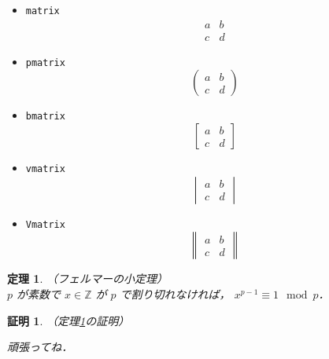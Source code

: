 \documentclass[uplatex]{jsarticle}
\newtheorem{thm}{定理}
\newtheorem{prf}{証明}
\begin{document}
\begin{itemize}
    \item \verb|matrix|
    \begin{equation}
    \begin{matrix}
        a & b \\
        c & d 
    \end{matrix}
    \end{equation}
    \item \verb|pmatrix|
    \begin{equation}
    \begin{pmatrix}
        a & b \\
        c & d 
    \end{pmatrix}
    \end{equation}
    \item \verb|bmatrix|
    \begin{equation}
    \begin{bmatrix}
        a & b \\
        c & d 
    \end{bmatrix}
    \end{equation}
    \item \verb|vmatrix|
    \begin{equation}
    \begin{vmatrix}
        a & b \\
        c & d 
    \end{vmatrix}
    \end{equation}
    \item \verb|Vmatrix|
    \begin{equation}
    \begin{Vmatrix}
        a & b \\
        c & d 
    \end{Vmatrix}
    \end{equation}
\end{itemize}

\begin{screen}
    \begin{thm}（フェルマーの小定理）\\
        \label{fermat}
        $p$ が素数で $x \in \mathbb{Z}$ が $p$ で割り切れなければ，
        $x^{p-1} \equiv 1 \mod{p}$．
    \end{thm}
\end{screen}

\begin{prf}
    （定理\ref{fermat}の証明）

    頑張ってね．
\end{prf}
\end{document}
